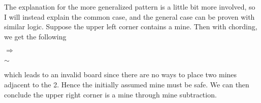 The explanation for the more generalized pattern is a little bit more involved, so I will instead explain the common case, and the general case can be proven with similar logic. Suppose the upper left corner contains a mine. Then with chording, we get the following
\begin{center}
    \begin{minipage}{0.2\linewidth}\centering\resizebox{1\linewidth}{!}{\begin{minesweeperboard}
        \cellflag \& \cellunk \& \cellunk \& \cellunk\\
        \celldc \& \cellone \& \celltwo \& \celldc\\
        \cellzero \& \cellzero \& \cellzero \& \cellzero\\
    \end{minesweeperboard}}\end{minipage}{\huge$\Rightarrow$}
    \begin{minipage}{0.2\linewidth}\centering\resizebox{1\linewidth}{!}{\begin{minesweeperboard}
        \cellflag \& \cellsafe \& \cellsafe \& \cellunk\\
        \celldc \& \cellone \& \celltwo \& \celldc\\
        \cellzero \& \cellzero \& \cellzero \& \cellzero\\
    \end{minesweeperboard}}\end{minipage}{\huge$\sim$}
    \begin{minipage}{0.2\linewidth}\centering\resizebox{1\linewidth}{!}{\begin{minesweeperboard}
        \cellflag \& \celldc \& \celldc \& \cellunk\\
        \celldc \& \cellone \& \celltwo \& \celldc\\
        \cellzero \& \cellzero \& \cellzero \& \cellzero\\
    \end{minesweeperboard}}\end{minipage}
\end{center}
which leads to an invalid board since there are no ways to place two mines adjacent to the 2. Hence the initially assumed mine must be safe. We can then conclude the upper right corner is a mine through mine subtraction.

